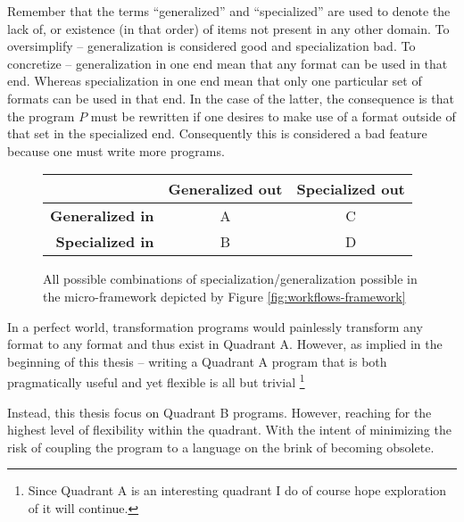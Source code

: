 \documentclass{scrreprt}
\begin{document}
Remember that the terms ``generalized'' and ``specialized'' are used to denote the lack of, or existence (in that order) of items not present in any other domain. To oversimplify -- generalization is considered good and specialization bad. To concretize -- generalization in one end mean that any format can be used in that end. Whereas specialization in one end mean that only one particular set of formats can be used in that end. In the case of the latter, the consequence is that the program $P$ must be rewritten if one desires to make use of a format outside of that set in the specialized end. Consequently this is considered a bad feature because one must write more programs.

\begin{figure}[h]
  \centering

  \def\arraystretch{2.5}
  \begin{tabular}{|r|c|c|}
    \hline

    & \textbf{Generalized out} & \textbf{Specialized out} \\ \hline

    \textbf{Generalized in} &
    \cellcolor[HTML]{33FF99} A
    &
    \cellcolor[HTML]{FFFFCC} C

    \\ \hline

    \textbf{Specialized in} &
    \cellcolor[HTML]{CCFF99} B
    &
    \cellcolor[HTML]{FFFFFF} D

    \\ \hline
  \end{tabular}

  \caption{All possible combinations of specialization/generalization possible in the micro-framework depicted by Figure \ref{fig:workflows-framework}}
  \label{fig:microframework-quadrant}
\end{figure}


In a perfect world, transformation programs would painlessly transform any format to any format and thus exist in  Quadrant A. However, as implied in the beginning of this thesis -- writing a Quadrant A program that is both pragmatically useful and yet flexible is all but trivial \footnote{Since Quadrant A is an interesting quadrant I do of course hope exploration of it will continue.}

Instead, this thesis focus on Quadrant B programs. However, reaching for the highest level of flexibility within the quadrant. With the intent of minimizing the risk of coupling the program to a language on the brink of becoming obsolete.
\end{document}
